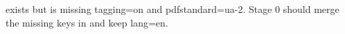\documentclass{article}
\begin{document}
\DocumentMetadata exists but is missing tagging=on and pdfstandard=ua-2.
Stage 0 should merge the missing keys in and keep lang=en.
\end{document}
